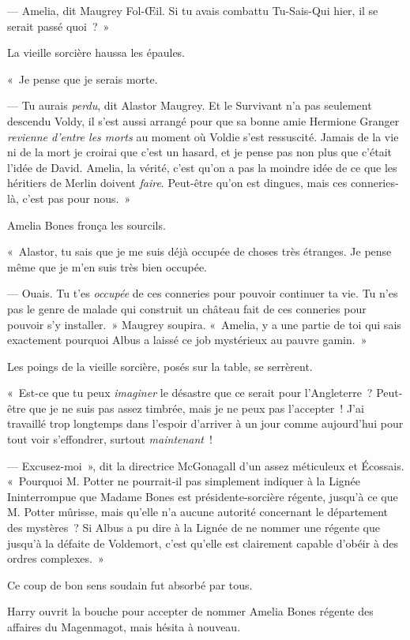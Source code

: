 --- Amelia, dit Maugrey Fol-Œil.
Si tu avais combattu Tu-Sais-Qui hier, il se serait passé quoi~?~»

La vieille sorcière haussa les épaules.

«~Je pense que je serais morte.

--- Tu aurais \emph{perdu}, dit Alastor Maugrey.
Et le Survivant n'a pas seulement descendu Voldy, il s'est aussi arrangé pour que sa bonne amie Hermione Granger \emph{revienne d'entre les morts} au moment où Voldie s'est ressuscité.
Jamais de la vie ni de la mort je croirai que c'est un hasard, et je pense pas non plus que c'était l'idée de David.
Amelia, la vérité, c'est qu'on a pas la moindre idée de ce que les héritiers de Merlin doivent \emph{faire}.
Peut-être qu'on est dingues, mais ces conneries-là, c'est pas pour nous.~»

Amelia Bones fronça les sourcils.

«~Alastor, tu sais que je me suis déjà occupée de choses très étranges.
Je pense même que je m'en suis très bien occupée.

--- Ouais.
Tu t'es \emph{occupée} de ces conneries pour pouvoir continuer ta vie.
Tu n'es pas le genre de malade qui construit un château fait de ces conneries pour pouvoir s'y installer.~»
Maugrey soupira.
«~Amelia, y a une partie de toi qui sais exactement pourquoi Albus a laissé ce job mystérieux au pauvre gamin.~»

Les poings de la vieille sorcière, posés sur la table, se serrèrent.

«~Est-ce que tu peux \emph{imaginer} le désastre que ce serait pour l'Angleterre~?
Peut-être que je ne suis pas assez timbrée, mais je ne peux pas l'accepter~!
J'ai travaillé trop longtemps dans l'espoir d'arriver à un jour comme aujourd'hui pour tout voir s'effondrer, surtout \emph{maintenant}~!

--- Excusez-moi~», dit la directrice McGonagall d'un assez méticuleux et Écossais.
«~Pourquoi M. Potter ne pourrait-il pas simplement indiquer à la Lignée Ininterrompue que Madame Bones est présidente-sorcière régente, jusqu'à ce que M. Potter mûrisse, mais qu'elle n'a aucune autorité concernant le département des mystères~?
Si Albus a pu dire à la Lignée de ne nommer une régente que jusqu'à la défaite de Voldemort, c'est qu'elle est clairement capable d’obéir à des ordres complexes.~»

Ce coup de bon sens soudain fut absorbé par tous.

Harry ouvrit la bouche pour accepter de nommer Amelia Bones régente des affaires du Magenmagot, mais hésita à nouveau.

